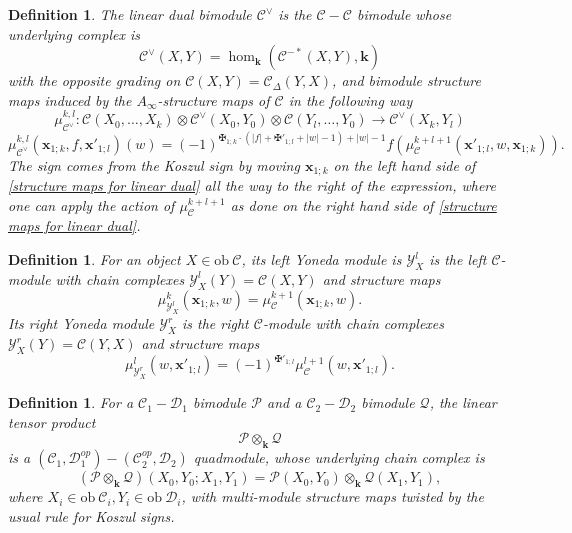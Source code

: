 \documentclass[11pt]{amsproc}
\def\K{{\mathbf{k}}}
\def\Y{\mathcal{Y}}
\def\cP{\mathcal{P}}
\def\cQ{\mathcal{Q}}
\def\cc{\mathcal{C}}
\def\dd{\mathcal{D}}
\def\D{\Delta}
\def\ainf{A_\infty}
\def\ob{\mathrm{ob\ }}
\newtheorem{defn}[lem]{Definition}
\theoremstyle{remark}
\numberwithin{equation}{section}
\begin{document}
\begin{defn}\label{def: linear dual bimodule}
The {\it linear dual bimodule} $\cc^{\vee}$ is the $\cc-\cc$ bimodule whose underlying complex is
\begin{equation}
\cc^{\vee}(X, Y) = \hom_{\K}(\cc^{-*}(X, Y), \K)
\end{equation}
with the opposite grading on $\cc(X, Y) = \cc_{\D}(Y, X)$,
and bimodule structure maps induced by the $\ainf$-structure maps of $\cc$ in the following way
\begin{equation}
\mu^{k, l}_{\cc^{\vee}}: \cc(X_{0}, \ldots, X_{k}) \otimes \cc^{\vee}(X_{0}, Y_{0}) \otimes \cc(Y_{l}, \ldots, Y_{0}) \to \cc^{\vee}(X_{k}, Y_{l})
\end{equation}
\begin{equation}\label{structure maps for linear dual}
\mu^{k, l}_{\cc^{\vee}}(\mathbf{x}_{1;k}, f, \mathbf{x}'_{1;l})(w) = (-1)^{\maltese_{1;k} \cdot (|f| + \maltese'_{1;l} + |w| - 1) + |w| -1}f(\mu_{\cc}^{k+l+1}(\mathbf{x}'_{1;l}, w, \mathbf{x}_{1;k})).
\end{equation}
The sign comes from the Koszul sign by moving $\mathbf{x}_{1;k}$ on the left hand side of \eqref{structure maps for linear dual} all the way to the right of the expression, 
where one can apply the action of $\mu^{k+l+1}_{\cc}$ as done on the right hand side of \eqref{structure maps for linear dual}.
\end{defn}

\begin{defn}\label{def: yoneda modules}
For an object $X \in \ob \cc$, its left Yoneda module is $\Y^{l}_{X}$ is the left $\cc$-module with chain complexes $\Y^{l}_{X}(Y) = \cc(X, Y)$ and structure maps
\begin{equation}\label{structure maps for left yoneda}
\mu^{k}_{\Y^{l}_{X}}(\mathbf{x}_{1;k}, w) = \mu_{\cc}^{k+1}(\mathbf{x}_{1;k}, w).
\end{equation}
Its right Yoneda module $\Y^{r}_{X}$ is the right $\cc$-module with chain complexes $\Y^{r}_{X}(Y) = \cc(Y, X)$ and structure maps 
\begin{equation}
\mu^{l}_{\Y^{r}_{X}}(w, \mathbf{x}'_{1;l}) = (-1)^{\maltese'_{1;l}} \mu_{\cc}^{l+1}(w, \mathbf{x}'_{1;l}).
\end{equation}
\end{defn}

\begin{defn}
For a $\cc_{1}-\dd_{1}$ bimodule $\cP$ and a $\cc_{2}-\dd_{2}$ bimodule $\cQ$,
the {\it linear tensor product}
\begin{equation}
\cP \otimes_{\K} \cQ
\end{equation}
is a $(\cc_{1}, \dd_{1}^{op})-(\cc_{2}^{op}, \dd_{2})$ quadmodule,
whose underlying chain complex is 
\begin{equation}
(\cP \otimes_{\K} \cQ)(X_{0}, Y_{0}; X_{1}, Y_{1}) = \cP(X_{0}, Y_{0}) \otimes_{\K} \cQ(X_{1}, Y_{1}),
\end{equation}
where $X_{i} \in \ob \cc_{i}, Y_{i} \in \ob \dd_{i}$,
with multi-module structure maps twisted by the usual rule for Koszul signs.
\end{defn}
\end{document}
